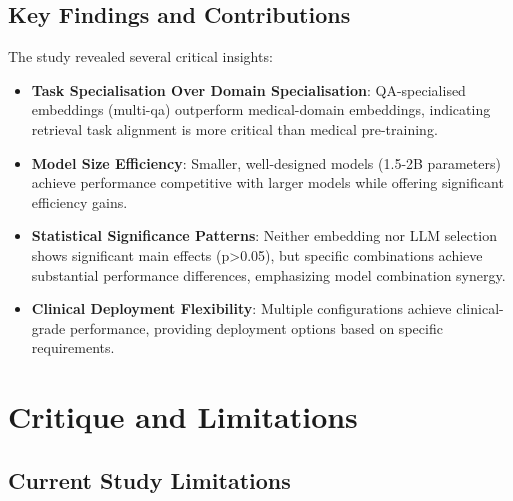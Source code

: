 \subsection{Key Findings and Contributions}

The study revealed several critical insights:

\begin{itemize}
    \item \textbf{Task Specialisation Over Domain Specialisation}: QA-specialised embeddings (multi-qa) outperform medical-domain embeddings, indicating retrieval task alignment is more critical than medical pre-training.
    
    \item \textbf{Model Size Efficiency}: Smaller, well-designed models (1.5-2B parameters) achieve performance competitive with larger models while offering significant efficiency gains.
    
    \item \textbf{Statistical Significance Patterns}: Neither embedding nor LLM selection shows significant main effects (p>0.05), but specific combinations achieve substantial performance differences, emphasizing model combination synergy.
    
    \item \textbf{Clinical Deployment Flexibility}: Multiple configurations achieve clinical-grade performance, providing deployment options based on specific requirements.
\end{itemize}

\section{Critique and Limitations}

\subsection{Current Study Limitations}

